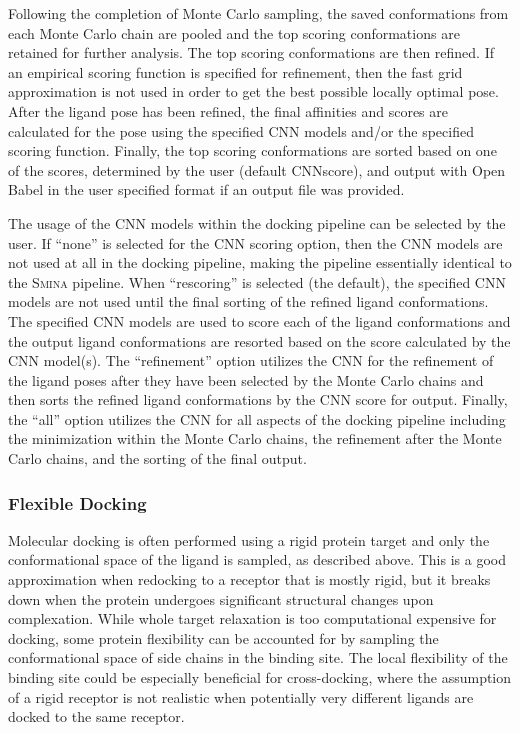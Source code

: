 \documentclass[journal=jcisd8,manuscript=article]{achemso}
\begin{document}
Following the completion of Monte Carlo sampling, the saved conformations from each Monte Carlo chain are pooled and the top scoring conformations are retained for further analysis. The top scoring conformations are then refined.  If an empirical scoring function is specified for refinement, then the fast grid approximation is not used in order to get the best possible locally optimal pose. After the ligand pose has been refined, the final affinities and scores are calculated for the pose using the specified CNN models and/or the specified scoring function. Finally, the top scoring conformations are sorted based on one of the scores, determined by the user (default CNNscore), and output with Open Babel in the user specified format if an output file was provided.


The usage of the CNN models within the docking pipeline can be selected by the user. If ``none'' is selected for the CNN scoring option, then the CNN models are not used at all in the docking pipeline, making the pipeline essentially identical to the \textsc{Smina} pipeline. When ``rescoring'' is selected (the default), the specified CNN models are not used until the final sorting of the refined ligand conformations. The specified CNN models are used to score each of the ligand conformations and the output ligand conformations are resorted based on the score calculated by the CNN model(s). The ``refinement'' option utilizes the CNN for the refinement of the ligand poses after they have been selected by the Monte Carlo chains and then sorts the refined ligand conformations by the CNN score for output. Finally, the ``all'' option utilizes the CNN for all aspects of the docking pipeline including the minimization within the Monte Carlo chains, the refinement after the Monte Carlo chains, and the sorting of the final output. 

\subsubsection{Flexible Docking}

Molecular docking is often performed using a rigid protein target and only the conformational space of the ligand is sampled, as described above. This is a good approximation when redocking to a receptor that is mostly rigid, but it breaks down when the protein undergoes significant structural changes upon complexation\cite{Teague2003}. While whole target relaxation is too computational expensive for docking, some protein flexibility can be accounted for by sampling the conformational space of side chains in the binding site\cite{Zhao2008}. The local flexibility of the binding site could be especially beneficial for cross-docking, where the assumption of a rigid receptor is not realistic when potentially very different ligands are docked to the same receptor.
\end{document}
